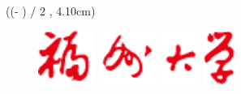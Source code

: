 
\pagestyle{empty}{\fancyhf{}}
\begin{titlepage}


    \begin{textblock*}{\textwidth}(\dimexpr (\paperwidth - \textwidth) / 2 \relax, 4.10cm) %
        \begin{figure}[H]
            \centering
            \includegraphics[height=1.85cm, keepaspectratio]{TemplateAssets/fzu1.pdf}
            \hspace{0.56cm}
            \includegraphics[height=1.85cm, keepaspectratio]{TemplateAssets/fzu2.pdf}
            \hspace{0.56cm}
            \includegraphics[height=1.85cm, keepaspectratio]{TemplateAssets/fzu3.pdf}
            \hspace{0.56cm}
            \includegraphics[height=1.85cm, keepaspectratio]{TemplateAssets/fzu4.pdf}
        \end{figure}
    \end{textblock*}


\end{titlepage}
